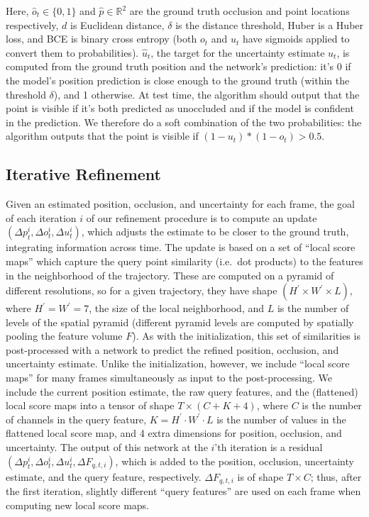 \documentclass[10pt,twocolumn,letterpaper]{article}
\begin{document}
Here, $\hat{o}_t\in \{0,1\}$ and $\hat{p}\in \mathbb{R}^{2}$ are the ground truth occlusion and point locations respectively, $d$ is Euclidean distance, $\delta$ is the distance threshold, Huber is a Huber loss, and BCE is binary cross entropy (both $o_t$ and $u_t$ have sigmoids applied to convert them to probabilities).  $\hat{u}_t$, the target for the uncertainty estimate $u_t$, is computed from the ground truth position and the network's prediction: it's 0 if the model's position prediction is close enough to the ground truth (within the threshold $\delta$), and 1 otherwise.  At test time, the algorithm should output that the point is visible if it's both predicted as unoccluded and if the model is confident in the prediction.  We therefore do a soft combination of the two probabilities: the algorithm outputs that the point is visible if $(1-u_t)*(1-o_t)>0.5$.

\subsection{Iterative Refinement}

Given an estimated position, occlusion, and uncertainty for each frame, the goal of each iteration $i$ of our refinement procedure is to compute an update $(\Delta p^i_t, \Delta o^i_t, \Delta u^i_t)$, which adjusts the estimate to be closer to the ground truth, integrating information across time.  The update is based on a set of ``local score maps'' which capture the query point similarity (i.e.\ dot products) to the features in the neighborhood of the trajectory.  These are computed on a pyramid of different resolutions, so for a given trajectory, they have shape $(H^{\prime}\times W^{\prime}\times L)$, where $H^{\prime}=W^{\prime}=7$, the size of the local neighborhood, and $L$ is the number of levels of the spatial pyramid (different pyramid levels are computed by spatially pooling the feature volume $F$).  As with the initialization, this set of similarities is post-processed with a network to predict the refined position, occlusion, and uncertainty estimate.  Unlike the initialization, however, we include ``local score maps'' for many frames simultaneously as input to the post-processing.  We include the current position estimate, the raw query features, and the (flattened) local score maps into a tensor of shape $T \times (C+K+4)$, where $C$ is the number of channels in the query feature, $K=H^{\prime}\cdot W^{\prime}\cdot L$ is the number of values in the flattened local score map, and 4 extra dimensions for position, occlusion, and uncertainty.  The output of this network at the $i$'th iteration is a residual $(\Delta p^i_t, \Delta o^i_t, \Delta u^i_t, \Delta F_{q,t,i})$, which is added to the position, occlusion, uncertainty estimate, and the query feature, respectively. $\Delta F_{q,t,i}$ is of shape $T\times C$; thus, after the first iteration, slightly different ``query features'' are used on each frame when computing new local score maps. 
\end{document}
